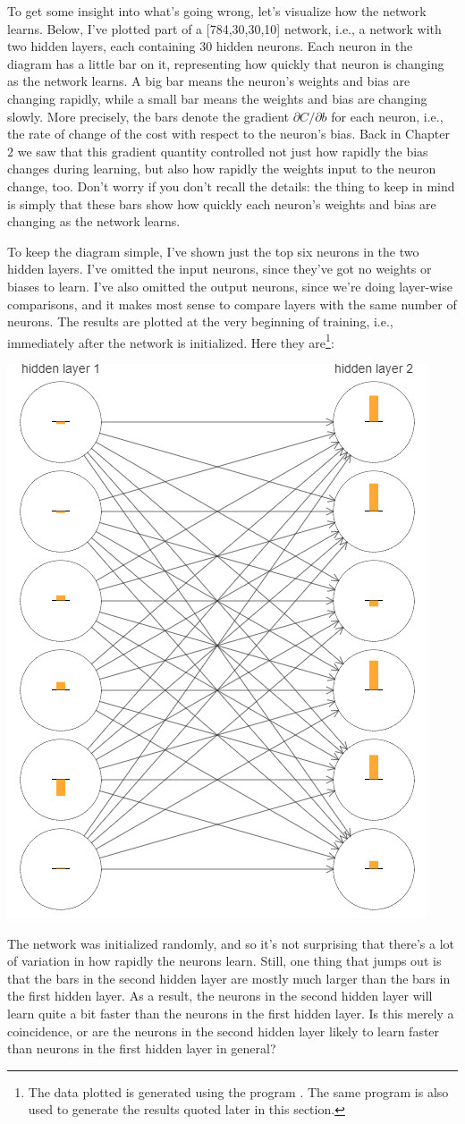 \documentclass[a4paper,twoside,10pt]{book}
\begin{document}
To get some insight into what's going wrong, let's visualize how the network learns. Below, I've plotted part of a [784,30,30,10] network, i.e., a network with two hidden layers, each containing 30 hidden neurons. Each neuron in the diagram has a little bar on it, representing how quickly that neuron is changing as the network learns. A big bar means the neuron's weights and bias are changing rapidly, while a small bar means the weights and bias are changing slowly. More precisely, the bars denote the gradient $\partial C/\partial b$ for each neuron, i.e., the rate of change of the cost with respect to the neuron's bias. Back in Chapter 2 we saw that this gradient quantity controlled not just how rapidly the bias changes during learning, but also how rapidly the weights input to the neuron change, too. Don't worry if you don't recall the details: the thing to keep in mind is simply that these bars show how quickly each neuron's weights and bias are changing as the network learns.

To keep the diagram simple, I've shown just the top six neurons in the two hidden layers. I've omitted the input neurons, since they've got no weights or biases to learn. I've also omitted the output neurons, since we're doing layer-wise comparisons, and it makes most sense to compare layers with the same number of neurons. The results are plotted at the very beginning of training, i.e., immediately after the network is initialized. Here they are\footnote{The data plotted is generated using the program . The same program is also used to generate the results quoted later in this section.}:
\begin{center}
	\includegraphics[width=0.5\linewidth]{figures/ch5/tikz500}
\end{center}
The network was initialized randomly, and so it's not surprising that there's a lot of variation in how rapidly the neurons learn. Still, one thing that jumps out is that the bars in the second hidden layer are mostly much larger than the bars in the first hidden layer. As a result, the neurons in the second hidden layer will learn quite a bit faster than the neurons in the first hidden layer. Is this merely a coincidence, or are the neurons in the second hidden layer likely to learn faster than neurons in the first hidden layer in general?
\end{document}
